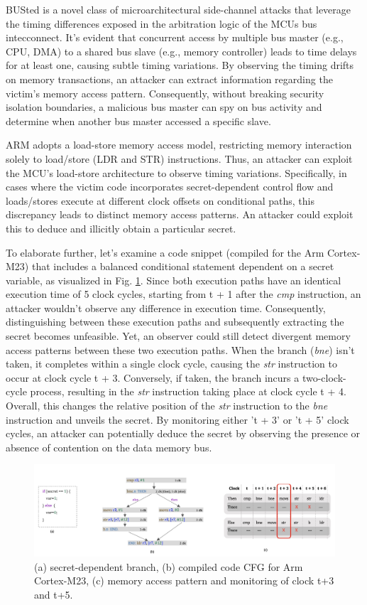 BUSted \cite{busted} is a novel class of microarchitectural side-channel attacks that leverage the timing differences exposed in the arbitration logic of the MCUs bus intecconnect. It's evident that concurrent access by multiple bus master (e.g., CPU, DMA) to a shared bus slave (e.g., memory controller) leads to time delays for at least one, causing subtle timing variations. By observing the timing drifts on memory transactions, an attacker can extract information regarding the victim’s memory access pattern. Consequently, without breaking security isolation boundaries, a malicious bus master can spy on bus activity and determine when another bus master accessed a specific slave.

ARM adopts a load-store memory access model, restricting memory interaction solely to load/store (LDR and STR) instructions. Thus, an attacker can exploit the MCU's load-store architecture to observe timing variations. Specifically, in cases where the victim code incorporates secret-dependent control flow and loads/stores execute at different clock offsets on conditional paths, this discrepancy leads to distinct memory access patterns. An attacker could exploit this to deduce and illicitly obtain a particular secret.

To elaborate further, let's examine a code snippet (compiled for the Arm Cortex-M23) that includes a balanced conditional statement dependent on a secret variable, as visualized in Fig. \ref{fig:busted}. Since both execution paths have an identical execution time of 5 clock cycles, starting from t + 1 after the \textit{cmp} instruction, an attacker wouldn't observe any difference in execution time. Consequently, distinguishing between these execution paths and subsequently extracting the secret becomes unfeasible. Yet, an observer could still detect divergent memory access patterns between these two execution paths. When the branch (\textit{bne}) isn't taken, it completes within a single clock cycle, causing the \textit{str} instruction to occur at clock cycle t + 3. Conversely, if taken, the branch incurs a two-clock-cycle process, resulting in the \textit{str} instruction taking place at clock cycle t + 4. Overall, this changes the relative position of the \textit{str} instruction to the \textit{bne} instruction and unveils the secret. By monitoring either 't + 3' or 't + 5' clock cycles, an attacker can potentially deduce the secret by observing the presence or absence of contention on the data memory bus.

\begin{figure}
  \centering
  \includegraphics[width=\textwidth]{figures/busted.jpg}
  \caption{(a) secret-dependent branch, (b) compiled code CFG for Arm Cortex-M23, (c) memory access pattern and monitoring of clock t+3 and t+5.}
  \label{fig:busted}
\end{figure}

